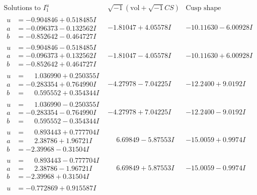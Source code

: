 \documentclass[1p]{elsarticle_modified}
\theoremstyle{definition}
\newcommand{\I}{\sqrt{-1}}
\begin{document}
$$\begin{array}{c|c|c}  
\text{Solutions to }I^u_{1}& \I (\text{vol} + \sqrt{-1}CS) & \text{Cusp shape}\\
 \hline 
\begin{aligned}
u &= -0.904846 + 0.518485 I \\
a &= -0.096373 - 0.132562 I \\
b &= -0.852642 - 0.464727 I\end{aligned}
 & -1.81047 + 4.05578 I & -10.11630 - 6.00928 I \\ \hline\begin{aligned}
u &= -0.904846 - 0.518485 I \\
a &= -0.096373 + 0.132562 I \\
b &= -0.852642 + 0.464727 I\end{aligned}
 & -1.81047 - 4.05578 I & -10.11630 + 6.00928 I \\ \hline\begin{aligned}
u &= \phantom{-}1.036990 + 0.250355 I \\
a &= -0.283354 + 0.764990 I \\
b &= \phantom{-}0.595552 + 0.354344 I\end{aligned}
 & -4.27978 - 7.04225 I & -12.2400 + 9.0192 I \\ \hline\begin{aligned}
u &= \phantom{-}1.036990 - 0.250355 I \\
a &= -0.283354 - 0.764990 I \\
b &= \phantom{-}0.595552 - 0.354344 I\end{aligned}
 & -4.27978 + 7.04225 I & -12.2400 - 9.0192 I \\ \hline\begin{aligned}
u &= \phantom{-}0.893443 + 0.777704 I \\
a &= \phantom{-}2.38786 + 1.96721 I \\
b &= -2.39968 - 0.31504 I\end{aligned}
 & \phantom{-}6.69849 - 5.87553 I & -15.0059 + 0.9974 I \\ \hline\begin{aligned}
u &= \phantom{-}0.893443 - 0.777704 I \\
a &= \phantom{-}2.38786 - 1.96721 I \\
b &= -2.39968 + 0.31504 I\end{aligned}
 & \phantom{-}6.69849 + 5.87553 I & -15.0059 - 0.9974 I \\ \hline\begin{aligned}
u &= -0.772869 + 0.915587 I \\

\end{aligned}
\end{array}$$
\end{document}
